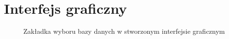 \chapter{Interfejs graficzny}

\begin{figure}[ht!]
  \centering
  \caption{Zakładka wyboru bazy danych w stworzonym interfejsie graficznym}
  \label{fig:gui-selection-tab}
\end{figure}

